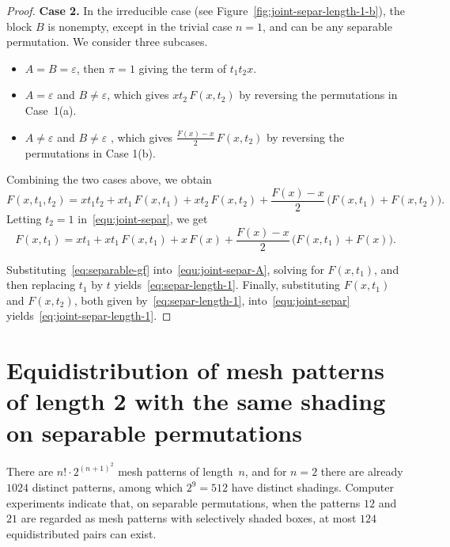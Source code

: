 \documentclass[10pt,a4paper]{article}
\begin{document}
\begin{proof}
\noindent \textbf{Case 2.}  In the irreducible case (see Figure~\ref{fig:joint-separ-length-1-b}), the block $B$ is nonempty, except in the trivial case $n=1$, and can be any separable permutation. We consider three subcases.

\begin{itemize}
	\item[(a)] $A=B=\varepsilon$, then  $\pi=1$ giving the term of  $t_1t_2x$.

	\item[(b)] $A = \varepsilon$ and $B \neq \varepsilon$, which gives $xt_2\,F(x,t_2)$ by reversing the permutations in Case~1(a).	
	\item[(c)]$A \neq \varepsilon$ and $B \neq \varepsilon$ , which gives $\frac{F(x) - x}{2}\, F(x,t_2)$ by reversing the permutations in Case 1(b).
	
\end{itemize}
	Combining the two cases above, we obtain
\begin{equation}\label{equ:joint-separ}
	F(x,t_1,t_2) = x t_1 t_2 + x t_1\, F(x,t_1) + x t_2\, F(x,t_2) + \frac{F(x) - x}{2}\, \big(F(x,t_1) + F(x,t_2)\big).
\end{equation}
Letting $t_2=1$ in~\eqref{equ:joint-separ}, we get
\begin{equation}\label{equ:joint-separ-A}
	F(x,t_1) = x t_1 + x t_1\, F(x,t_1) + x \, F(x) + \frac{F(x) - x}{2}\, \big(F(x,t_1) + F(x)\big).
\end{equation}

Substituting~\eqref{eq:separable-gf} into~\eqref{equ:joint-separ-A}, solving for $F(x,t_1)$,
and then replacing $t_1$ by $t$ yields~\eqref{eq:separ-length-1}.
Finally, substituting $F(x,t_1)$ and $F(x,t_2)$, both given by~\eqref{eq:separ-length-1},
into~\eqref{equ:joint-separ} yields~\eqref{eq:joint-separ-length-1}.\end{proof}


\section{Equidistribution of mesh patterns of length 2 with the same shading on separable permutations} \label{section:3}

There are $n!\cdot 2^{(n+1)^2}$ mesh patterns of length~$n$, and for $n=2$ there are already $1024$ distinct patterns, among which $2^{9}=512$ have distinct shadings. Computer experiments indicate that, on separable permutations, when the patterns $12$ and $21$ are regarded as mesh patterns with selectively shaded boxes, at most $124$ equidistributed pairs can exist.
\end{document}
